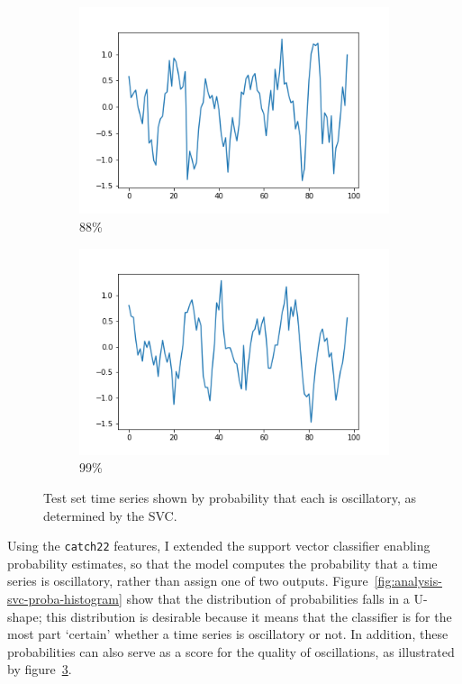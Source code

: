 \begin{figure}
  \begin{subfigure}[t]{0.45\textwidth}
  \centering
    \includegraphics[width=\linewidth]{proba_88}
    \caption{
      88\%
    }
    \label{fig:analysis-svc-proba-88}
  \end{subfigure}%
  \begin{subfigure}[t]{0.45\textwidth}
  \centering
    \includegraphics[width=\linewidth]{proba_99}
    \caption{
      99\%
    }
    \label{fig:analysis-svc-proba-99}
  \end{subfigure}
  \caption{
    Test set time series shown by probability that each is oscillatory, as determined by the SVC.
  }
  \label{fig:analysis-svc-proba-gallery}
\end{figure}

Using the \texttt{catch22} features, I extended the support vector classifier enabling probability estimates, so that the model computes the probability that a time series is oscillatory, rather than assign one of two outputs.
Figure~\ref{fig:analysis-svc-proba-histogram} show that the distribution of probabilities falls in a U-shape; this distribution is desirable because it means that the classifier is for the most part `certain' whether a time series is oscillatory or not.
In addition, these probabilities can also serve as a score for the quality of oscillations, as illustrated by figure~\ref{fig:analysis-svc-proba-gallery}.

